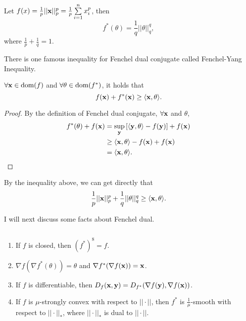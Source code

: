 \documentclass[../main.tex]{subfiles}
\begin{document}
\begin{example}
	Let $f(x) = \frac{1}{p} ||\mathbf{x}||_p^p = \frac{1}{p} \sum\limits_{i=1}^n x_i^p$, then
	\begin{equation*}
		f^*(\theta) = \frac{1}{q} ||\theta||_q^q,
	\end{equation*}
	where $\frac{1}{p} + \frac{1}{q} = 1$.
\end{example}

There is one famous inequality for Fenchel dual conjugate called Fenchel-Yang Inequality.

\begin{theorem}
	$\forall \mathbf{x} \in \textmd{dom}(f)$ and $\forall \theta \in \textmd{dom}(f^*)$, it holds that 
	\begin{equation}
	f(\mathbf{x}) + f^*(\mathbf{x}) \geq \langle \mathbf{x}, \theta \rangle.
	\end{equation}
\end{theorem}

\begin{proof}
	By the definition of Fenchel dual conjugate, $\forall \mathbf{x}$ and $\theta$,
	\begin{equation*}
	\begin{aligned}
		f^*(\theta) + f(\mathbf{x}) & = \sup_{\mathbf{y}} \left[ \langle \mathbf{y}, \theta \rangle - f(\mathbf{y})\right] +f(\mathbf{x}) \\
		&\geq  \langle \mathbf{x}, \theta \rangle - f(\mathbf{x}) + f(\mathbf{x}) \\
		& = \langle \mathbf{x}, \theta \rangle.
	\end{aligned}
	\end{equation*}
\end{proof}

\begin{corollary}
	By the inequality above, we can get directly that
	\begin{equation*}
		\frac{1}{p} ||\mathbf{x}||_p^p + \frac{1}{q} ||\theta||_q^q \geq \langle \mathbf{x}, \theta\rangle. 
	\end{equation*}
\end{corollary}

I will next discuss some facts about Fenchel dual.
\begin{fact}$ $
	\begin{enumerate}
		\item If $f$ is closed, then $(f^*)^8 = f$.
		\item $\nabla f (\nabla f^*(\theta)) = \theta$ and $\nabla f^*(\nabla f(\mathbf{x})) =\mathbf{x}$.
		\item If $f$ is differentiable, then $D_f(\mathbf{x},\mathbf{y}) = D_{f^*}(\nabla f(\mathbf{y}), \nabla f(\mathbf{x}))$.
		\item If $f$ is $\mu$-strongly convex with respect to $||\cdot||$, then $f^*$ is $\frac{1}{\mu}$-smooth with respect to $||\cdot||_*$, where $||\cdot||_*$ is dual to $||\cdot||$.
	\end{enumerate}
\end{fact}
\end{document}
